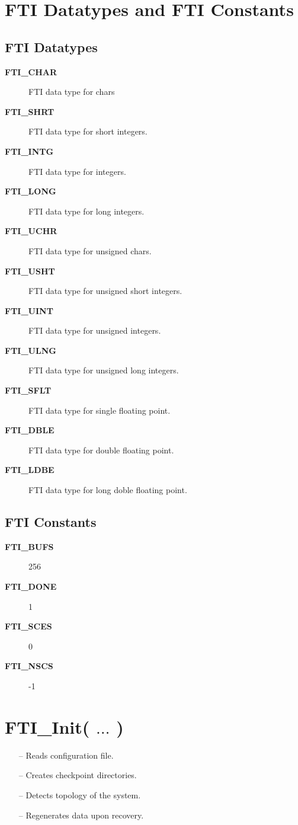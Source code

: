 \documentclass{refrep}
\begin{document}
\section{FTI Datatypes and FTI Constants}\label{sec:datatypesandconstants}
\subsection{FTI Datatypes}\label{sec:datatypes}
\begin{description}
\item[\textbf{FTI\_CHAR}] FTI data type for chars
\item[\textbf{FTI\_SHRT}] FTI data type for short integers.
\item[\textbf{FTI\_INTG}] FTI data type for integers.
\item[\textbf{FTI\_LONG}] FTI data type for long integers.
\item[\textbf{FTI\_UCHR}] FTI data type for unsigned chars.
\item[\textbf{FTI\_USHT}] FTI data type for unsigned short integers.
\item[\textbf{FTI\_UINT}] FTI data type for unsigned integers.
\item[\textbf{FTI\_ULNG}] FTI data type for unsigned long integers.
\item[\textbf{FTI\_SFLT}] FTI data type for single floating point.
\item[\textbf{FTI\_DBLE}] FTI data type for double floating point.
\item[\textbf{FTI\_LDBE}] FTI data type for long doble floating point.
\end{description}
\subsection{FTI Constants}
\begin{description}
\item[\textbf{FTI\_BUFS}] 256
\item[\textbf{FTI\_DONE}] 1
\item[\textbf{FTI\_SCES}] 0
\item[\textbf{FTI\_NSCS}] -1
\end{description}
\newpage
\section{\asciifamily FTI\_Init( $\dots$ )}\label{sec:ftiinit}
\begin{framed}
\begin{itemize}
\item[--] Reads configuration file.
\item[--] Creates checkpoint directories.
\item[--] Detects topology of the system.
\item[--] Regenerates data upon recovery.
\end{itemize}
\end{framed}
\end{document}

